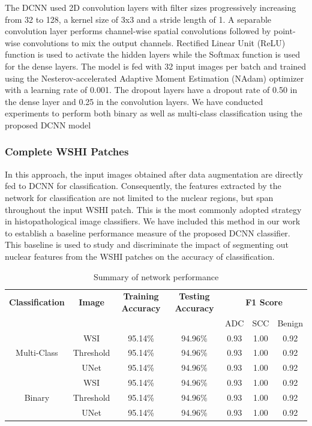 \documentclass{comjnl}
\begin{document}
The DCNN used 2D convolution layers with filter sizes progressively increasing from 32 to 128, a kernel size of 3x3 and a stride length of 1. A separable convolution layer performs channel-wise spatial convolutions followed by point-wise convolutions to mix the output channels. Rectified Linear Unit (ReLU) function is used to activate the hidden layers while the Softmax function is used for the dense layers. The model is fed with 32 input images per batch and trained using the Nesterov-accelerated Adaptive Moment Estimation (NAdam) optimizer with a learning rate of 0.001. The dropout layers have a dropout rate of 0.50 in the dense layer and 0.25 in the convolution layers. We have conducted experiments to perform both binary as well as multi-class classification using the proposed DCNN model

\subsubsection{Complete WSHI Patches}
In this approach, the input images obtained after data augmentation are directly fed to DCNN for classification. Consequently, the features extracted by the network for classification are not limited to the nuclear regions, but span throughout the input WSHI patch. This is the most commonly adopted strategy in histopathological image classifiers. We have included this method in our work to establish a baseline performance measure of the proposed DCNN classifier. This baseline is used to study and discriminate the impact of segmenting out nuclear features from the WSHI patches on the accuracy of classification. 


\begin{table} 
\begin{center}
\begin{tabular}[scale=2.0]{ |c|c|c|c|c|c|c| }
  \hline
  \textbf{Classification}&\textbf{Image}&\textbf{Training Accuracy}&\textbf{Testing Accuracy}&\multicolumn{3}{c|}{\textbf{F1 Score}}\\\cline{5-7}
  &&&&ADC&SCC&Benign\\
  \hline
  
  \multirow{3}{*}{Multi-Class}&WSI&95.14\%&94.96\%&0.93&1.00&0.92\\\cline{2-7}
  &Threshold&95.14\%&94.96\%&0.93&1.00&0.92\\\cline{2-7}
  &UNet&95.14\%&94.96\%&0.93&1.00&0.92\\
  \hline
  
  \multirow{3}{*}{Binary}&WSI&95.14\%&94.96\%&0.93&1.00&0.92\\\cline{2-7}
  &Threshold&95.14\%&94.96\%&0.93&1.00&0.92\\\cline{2-7}
  &UNet&95.14\%&94.96\%&0.93&1.00&0.92\\
  \hline
  
\end{tabular}
\caption{Summary of network performance}
\label{metrics_summary}
\end{center}
\end{table} 

   
  
\end{document}
